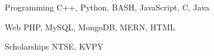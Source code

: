 \begin{cvskills}

  \cvskill
  {Programming}
  {C++, Python, BASH, JavaScript, C, Java}

  \cvskill
  {Web}
  {PHP, MySQL, MongoDB, MERN, HTML}

  \cvskill
  {Scholarships}
  {NTSE, KVPY}


\end{cvskills}

